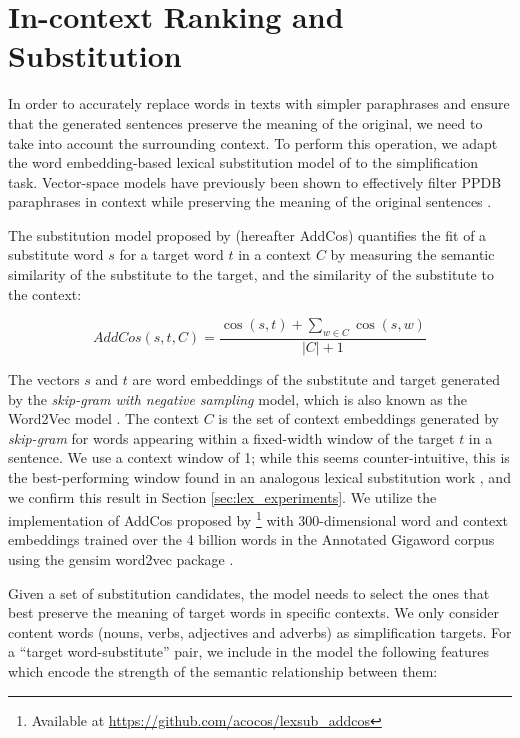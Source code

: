 \documentclass[thesis.tex]{subfiles}
\begin{document}
\section{In-context Ranking and Substitution}

In order to accurately replace words in texts with simpler paraphrases and ensure that the generated sentences preserve the meaning of the original, we need to take into account the surrounding context. To perform this operation, we adapt the word embedding-based lexical substitution model of \cite{melamud2015simple} to the simplification task. Vector-space models have previously been shown to effectively filter PPDB paraphrases in context while preserving the meaning of the original sentences \citep{apidianaki2016vector,cocos2017word}.

The substitution model proposed by \cite{melamud2015simple} (hereafter AddCos) quantifies the fit of a substitute word $s$ for a target word $t$ in a context $C$ by measuring the semantic similarity of the substitute to the target, and the similarity of the substitute to the context:

\begin{equation}
AddCos(s,t,C) = \frac{\cos(s,t) + \sum_{w \in C} \cos(s,w)}{|C|+1}
\end{equation}

The vectors $s$ and $t$ are word embeddings of the substitute and target generated by the \textit{skip-gram with negative sampling} model, which is also known as the Word2Vec model \citep{mikolov2013efficient}. The context $C$ is the set of context embeddings generated by \textit{skip-gram} for words appearing within a fixed-width window of the target $t$ in a sentence. We use a context window of 1; while this seems counter-intuitive, this is the best-performing window found in an analogous lexical substitution work \citep{cocos2017word}, and we confirm this result in Section \ref{sec:lex_experiments}. We utilize the implementation of AddCos proposed by \cite{cocos2017word}\footnote{Available at \url{https://github.com/acocos/lexsub_addcos}} with 300-dimensional word and context embeddings trained over the 4 billion words in the Annotated Gigaword corpus \citep{napoles2012annotated} using the gensim word2vec package \citep{mikolov2013efficient}.

Given a set of substitution candidates, the model needs to select the ones that best preserve the meaning of target words in specific contexts. We only consider content words (nouns, verbs, adjectives and adverbs) as simplification targets. For a ``target word-substitute'' pair, we include in the model the following features which encode the strength of the semantic relationship between them:
\end{document}

